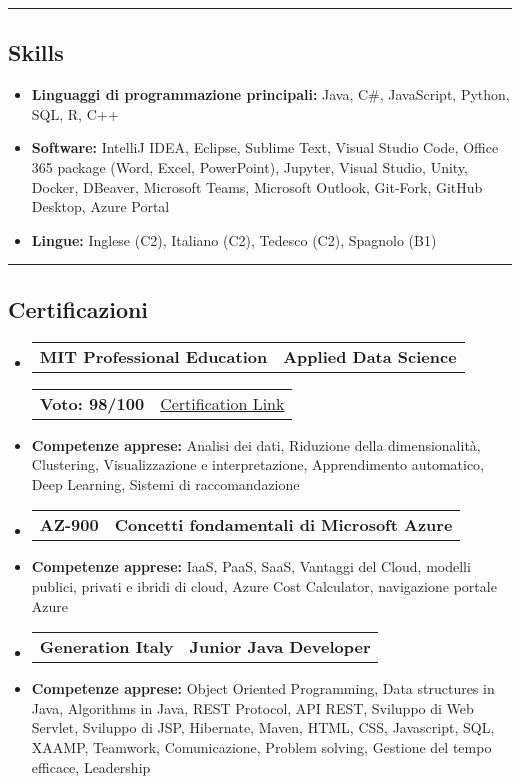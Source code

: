 \documentclass[11pt,letterpaper]{article}
\makeatletter
\newcommand{\headerrow}[2]
{\begin{tabular*}{\linewidth}{l@{\extracolsep{\fill}}r}
#1 &
#2 \\
\end{tabular*}}
\makeatother
\begin{document}
\hrule
\vspace{-1em}
\subsection*{\Large Skills}

\begin{itemize}[leftmargin=1em,noitemsep]
	\item \textbf{Linguaggi di programmazione principali:} Java, C\#, JavaScript, Python, SQL, R, C++
	\item \textbf{Software:} IntelliJ IDEA, Eclipse, Sublime Text, Visual Studio Code, Office 365 package (Word, Excel, PowerPoint), Jupyter, Visual Studio, Unity, Docker, DBeaver, Microsoft Teams, Microsoft Outlook, Git-Fork, GitHub Desktop, Azure Portal
	\item \textbf{Lingue:} Inglese (C2), Italiano (C2), Tedesco (C2), Spagnolo (B1)
\end{itemize}

\hrule
\vspace{-1em}
\subsection*{\Large Certificazioni}

\begin{itemize}[leftmargin=1em]
	\parskip=0.1em
	\item
	      \headerrow
	      {\textbf{MIT Professional Education}}
	      {\textbf{Applied Data Science}}
	      \headerrow
	      {\textbf{Voto: 98/100}}
	      {\href{https://www.credential.net/06861b98-4e6f-4009-a5d2-f2fe0cbdded4}{Certification Link}}
        \item \textbf{Competenze apprese:} Analisi dei dati, Riduzione della dimensionalità, Clustering, Visualizzazione e interpretazione, Apprendimento automatico, Deep Learning, Sistemi di raccomandazione
        
	\item
	     \headerrow
	     {\textbf{AZ-900}}
	     {\textbf{Concetti fondamentali di Microsoft Azure}}
	     \item \textbf{Competenze apprese:} IaaS, PaaS, SaaS, Vantaggi del Cloud, modelli publici, privati e ibridi di cloud, Azure Cost Calculator, navigazione portale Azure
    \item
	    \headerrow
	    {\textbf{Generation Italy}}
	    {\textbf{Junior Java Developer}}
	    \item \textbf{Competenze apprese:} Object Oriented Programming, Data structures in Java, Algorithms in Java, REST Protocol, API REST, Sviluppo di Web Servlet, Sviluppo di JSP, Hibernate,  Maven, HTML, CSS, Javascript, SQL, XAAMP, Teamwork, Comunicazione, Problem solving, Gestione del tempo efficace, Leadership
    
\end{itemize}
\end{document}
